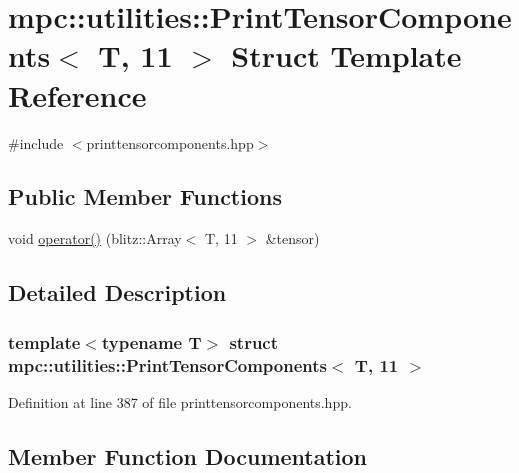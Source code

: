 \hypertarget{structmpc_1_1utilities_1_1_print_tensor_components_3_01_t_00_0111_01_4}{}\section{mpc\+:\+:utilities\+:\+:Print\+Tensor\+Components$<$ T, 11 $>$ Struct Template Reference}
\label{structmpc_1_1utilities_1_1_print_tensor_components_3_01_t_00_0111_01_4}


{\ttfamily \#include $<$printtensorcomponents.\+hpp$>$}

\subsection*{Public Member Functions}
\begin{DoxyCompactItemize}
\item 
void \mbox{\hyperlink{structmpc_1_1utilities_1_1_print_tensor_components_3_01_t_00_0111_01_4_add0d1c50a34678d8ecde1048b3f04b5f}{operator()}} (blitz\+::\+Array$<$ T, 11 $>$ \&tensor)
\end{DoxyCompactItemize}


\subsection{Detailed Description}
\subsubsection*{template$<$typename T$>$\newline
struct mpc\+::utilities\+::\+Print\+Tensor\+Components$<$ T, 11 $>$}



Definition at line 387 of file printtensorcomponents.\+hpp.



\subsection{Member Function Documentation}
\mbox{\label{structmpc_1_1utilities_1_1_print_tensor_components_3_01_t_00_0111_01_4_add0d1c50a34678d8ecde1048b3f04b5f}} 
